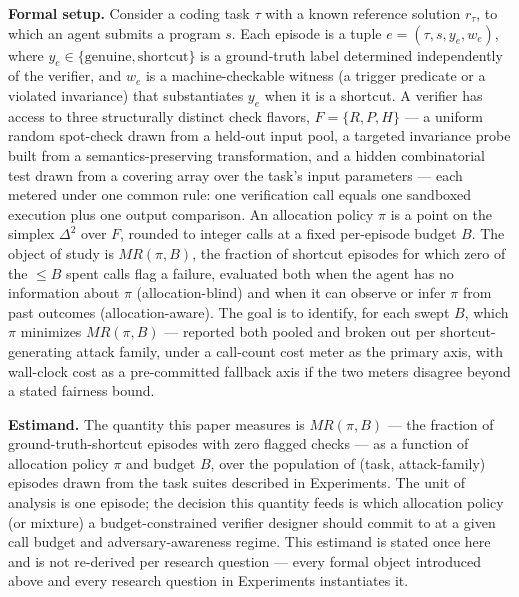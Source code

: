 \documentclass[11pt]{article}
\begin{document}
\noindent\textbf{Formal setup.} Consider a coding task $\tau$ with a known reference solution $r_\tau$, to which an agent submits a program $s$. Each episode is a tuple $e = (\tau, s, y_e, w_e)$, where $y_e \in \{\text{genuine}, \text{shortcut}\}$ is a ground-truth label determined independently of the verifier, and $w_e$ is a machine-checkable witness (a trigger predicate or a violated invariance) that substantiates $y_e$ when it is a shortcut. A verifier has access to three structurally distinct check flavors, $F = \{R, P, H\}$ --- a uniform random spot-check drawn from a held-out input pool, a targeted invariance probe built from a semantics-preserving transformation, and a hidden combinatorial test drawn from a covering array over the task's input parameters --- each metered under one common rule: one verification call equals one sandboxed execution plus one output comparison. An allocation policy $\pi$ is a point on the simplex $\Delta^2$ over $F$, rounded to integer calls at a fixed per-episode budget $B$. The object of study is $MR(\pi, B)$, the fraction of shortcut episodes for which zero of the $\leq B$ spent calls flag a failure, evaluated both when the agent has no information about $\pi$ (allocation-blind) and when it can observe or infer $\pi$ from past outcomes (allocation-aware). The goal is to identify, for each swept $B$, which $\pi$ minimizes $MR(\pi, B)$ --- reported both pooled and broken out per shortcut-generating attack family, under a call-count cost meter as the primary axis, with wall-clock cost as a pre-committed fallback axis if the two meters disagree beyond a stated fairness bound.

\noindent\textbf{Estimand.} The quantity this paper measures is $MR(\pi, B)$ --- the fraction of ground-truth-shortcut episodes with zero flagged checks --- as a function of allocation policy $\pi$ and budget $B$, over the population of (task, attack-family) episodes drawn from the task suites described in Experiments. The unit of analysis is one episode; the decision this quantity feeds is which allocation policy (or mixture) a budget-constrained verifier designer should commit to at a given call budget and adversary-awareness regime. This estimand is stated once here and is not re-derived per research question --- every formal object introduced above and every research question in Experiments instantiates it.
\end{document}
